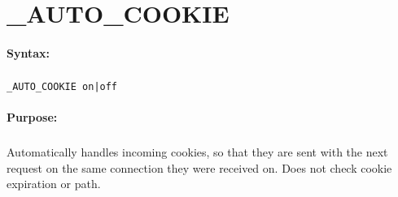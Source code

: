 
\newpage
\section{\_AUTO\_COOKIE}
\label{cmd:_AUTO_COOKIE}

\paragraph{Syntax:}
\subparagraph{}
\texttt{\_AUTO\_COOKIE on|off}

\paragraph{Purpose:}
\subparagraph{}
Automatically handles incoming cookies, so that they are sent 
with the next request on the same connection they were received on. 
Does not check cookie expiration or path.